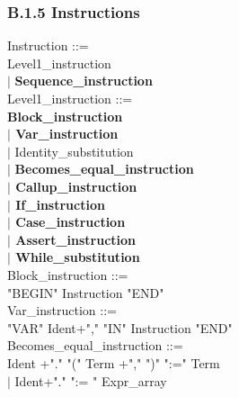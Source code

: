\documentclass[12pt,a4paper,draft]{article}
\begin{document}
{\begin{sloppypar}
\subsubsection{B.1.5 Instructions} 
\noindent Instruction ::= \\
\hspace*{0.20in}Level1\_instruction\\
\hspace*{0.20in} $|$ \textbf{ Sequence\_instruction}\\
Level1\_instruction ::= \\
\hspace*{0.20in}\textbf{Block\_instruction\\
\hspace*{0.20in} $|$  Var\_instruction}\\
\hspace*{0.20in} $|$  Identity\_substitution\\
\hspace*{0.20in} $|$\textbf{  Becomes\_equal\_instruction\\
\hspace*{0.20in} $|$  Callup\_instruction\\
\hspace*{0.20in} $|$  If\_instruction\\
\hspace*{0.20in} $|$  Case\_instruction\\ 
\hspace*{0.20in} $|$  Assert\_instruction\\
\hspace*{0.20in} $|$  While\_substitution\\}
Block\_instruction ::= \\
\hspace*{0.20in}  "BEGIN"  Instruction  "END" \\
Var\_instruction ::= \\
\hspace*{0.20in}"VAR"  Ident+","  "IN"  Instruction  "END" \\
Becomes\_equal\_instruction ::= \\
\hspace*{0.20in}  Ident +"."  "(" Term +","  ")"  ":="  Term  \\   %
\hspace*{0.20in} $|$ Ident+"."  ":= " Expr\_array  \\

\end{sloppypar}}
\end{document}
